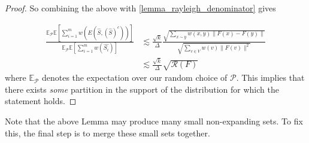 \documentclass[a4paper,11pt]{article}
\theoremstyle{definition}
\newcommand{\rayleigh}[1]{\mathcal{R}\left(#1\right)}
\newcommand{\E}[1]{\mathbb{E}\left[#1\right]}
\begin{document}
\begin{proof}
So combining the above with \eqref{lemma_rayleigh_denominator} gives

\begin{align*}
\frac{\mathbb{E}_{\mathcal{P}}\E{\displaystyle\sum_{i=1}^m w(E(\hat{S}, \left(\hat{S}\right)^c))}}{\mathbb{E}_{\mathcal{P}}\E{\displaystyle\sum_{i=1}^m w(\hat{S_i})}}
&\lesssim \frac{\sqrt{k}}{\Delta} \frac{\sqrt{\sum\limits_{x \sim y} w(x, y)\|F(x) - F(y)\|}}{\sqrt{\sum\limits_{v \in V} w(v)\|F(v)\|^2}} \\
&\lesssim \frac{\sqrt{k}}{\Delta} \sqrt{\rayleigh{F}}
\end{align*}
where $\mathbb{E}_{\mathcal{P}}$ denotes the expectation over our random choice of $\mathcal{P}$. This implies that there exists \emph{some} partition in the support of the distribution for which the statement holds.

\end{proof}

Note that the above Lemma may produce many small non-expanding sets. To fix this, the final step is to merge these small sets together.
\end{document}
